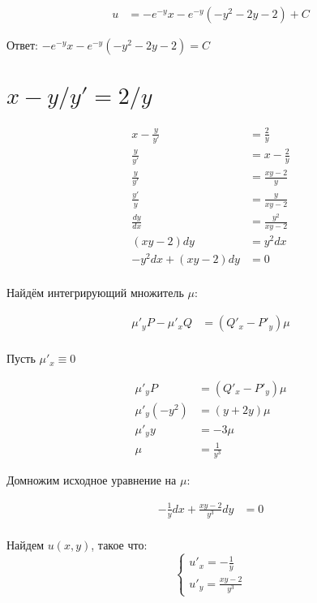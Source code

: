 \begin{align*}
    u & = -e^{-y}x - e^{-y}(-y^2-2y-2) + C
\end{align*}

Ответ: $-e^{-y}x - e^{-y}(-y^2-2y-2) = C$

\section{$x-y/y'=2/y$}

\begin{align*}
    x - \frac{y}{y'}   & = \frac{2}{y}        \\
    \frac{y}{y'}       & = x - \frac{2}{y}    \\
    \frac{y}{y'}       & = \frac{xy - 2}{y}   \\
    \frac{y'}{y}       & = \frac{y}{xy - 2}   \\
    \frac{dy}{dx}      & = \frac{y^2}{xy - 2} \\
    (xy-2)dy           & = y^2dx              \\
    - y^2dx + (xy-2)dy & =  0                 \\
\end{align*}

Найдём интегрирующий множитель $\mu$:

\begin{align*}
    \mu'_y P - \mu'_x Q & = (Q'_x - P'_y) \mu \\
\end{align*}

Пусть $\mu'_x \equiv0$

\begin{align*}
    \mu'_y P       & = (Q'_x - P'_y) \mu \\
    \mu'_y (- y^2) & = (y + 2y) \mu      \\
    \mu'_y y       & = -3 \mu            \\
    \mu            & = \frac{1}{y^3}
\end{align*}

Домножим исходное уравнение на $\mu$:

\begin{align*}
    -\frac{1}{y}dx + \frac{xy-2}{y^3}dy & = 0 \\
\end{align*}

Найдем $u(x, y)$, такое что:
\[\begin{cases}
        u'_x =  -\frac{1}{y} \\
        u'_y = \frac{xy-2}{y^3}
    \end{cases}\]

